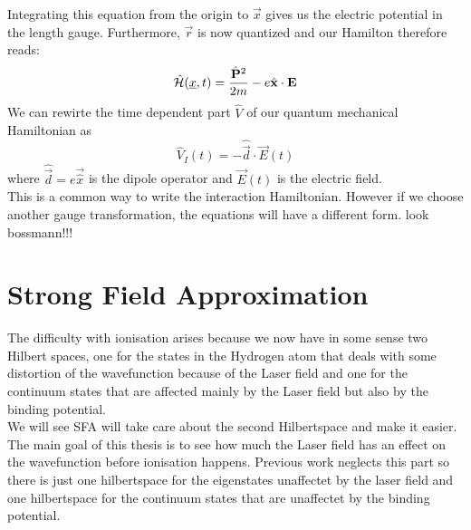 Integrating this equation from the origin to $\vec{x}$ gives us the electric potential in the length gauge. Furthermore, $\vec{r}$ is now quantized and our Hamilton therefore reads:
\begin{equation*}
    \hat{\Hs}(\uvec{x}, t) = \frac{\hat{\vec{P}}^2}{2m} - e \hat{\vec{x}} \cdot \vec{E} %
\end{equation*}
We can rewirte the time dependent part $\hat{V}$ of our quantum mechanical Hamiltonian as
\begin{equation}
    \hat{V}_I(t) = -\hat{\vec{d}} \cdot \vec{E}(t) \label{eq:dipoleApprox}
\end{equation}
where $\hat{\vec{d}}=e\vec{\hat{x}}$ is the dipole operator and $\vec{E}(t)$ is the electric field.\\
This is a common way to write the interaction Hamiltonian. 
However if we choose another gauge transformation, the equations will have a different form. look bossmann!!!







\newpage
\section{Strong Field Approximation}
The difficulty with ionisation arises because we now have in some sense two Hilbert spaces, one for the states in the Hydrogen atom that deals with some distortion of the wavefunction because of the Laser field and one for the continuum states that are affected mainly by the Laser field but also by the binding potential.\\
We will see SFA will take care about the second Hilbertspace and make it easier. 
The main goal of this thesis is to see how much the Laser field has an effect on the wavefunction before ionisation happens. 
Previous work neglects this part so there is just one hilbertspace for the eigenstates unaffectet by the laser field and one hilbertspace for the continuum states that are unaffectet by the binding potential.






